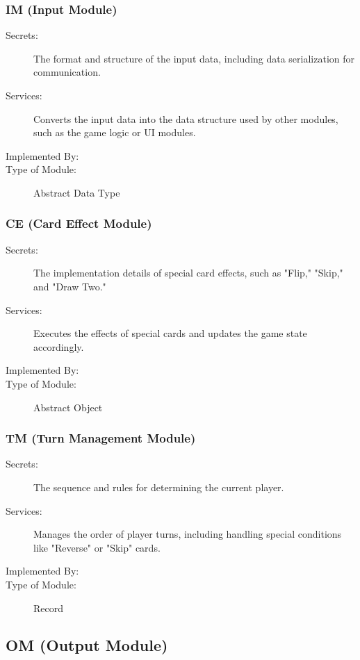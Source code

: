 \documentclass[12pt, titlepage]{article}
\begin{document}
\subsubsection{IM (Input Module)}

\begin{description}
\item[Secrets:] The format and structure of the input data, including data serialization for communication.
\item[Services:] Converts the input data into the data structure used by other
  modules, such as the game logic or UI modules.
\item[Implemented By:] \progname{}
\item[Type of Module:] Abstract Data Type
\end{description}

\subsubsection{CE (Card Effect Module)}

\begin{description}
\item[Secrets:] The implementation details of special card effects, such as "Flip," "Skip," and "Draw Two."
\item[Services:] Executes the effects of special cards and updates the game state accordingly.
\item[Implemented By:] \progname{}
\item[Type of Module:] Abstract Object
\end{description}

\subsubsection{TM (Turn Management Module)}

\begin{description}
\item[Secrets:] The sequence and rules for determining the current player.
\item[Services:] Manages the order of player turns, including handling special conditions like "Reverse" or "Skip" cards.
\item[Implemented By:] \progname{}
\item[Type of Module:] Record
\end{description}

\subsection{OM (Output Module)}
\end{document}
